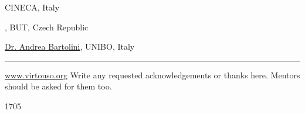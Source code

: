\documentclass[a4paper, twoside]{article}
\begin{document}
\begin{multicols}{3}
\begin{minipage}[b]{0.7\linewidth}
\begin{flushleft}
  CINECA, Italy
  
  \href{mailto:xstehl14@stud.fit.vutbr.cz}{\theauthor},
  BUT, Czech Republic
  
  \href{mailto:a.bartolini@unibo.it}{Dr. Andrea Bartolini}, UNIBO, Italy
\end{flushleft}
\end{minipage}\hfill%
\begin{minipage}[b]{0.3\linewidth}
  \color{prace-darkblue}\rule{\linewidth}{2.5cm}\par
  \tiny\theauthor
\end{minipage}%
\vspace{-1.5ex}%
\begin{flushleft}
  \href{http://www.virtouso.org}{www.virtouso.org}
  Write any requested acknowledgements or thanks here. Mentors should be
  asked for them too.

     1705
\end{flushleft}
\end{multicols}
\end{document}
